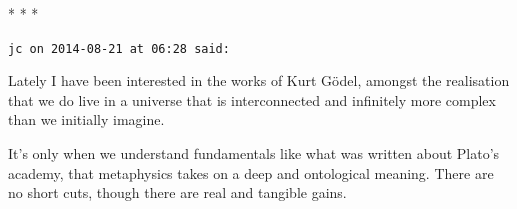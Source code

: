 
\begin{center}* * *\end{center}

\begin{footnotesize}\begin{sffamily}

\texttt{jc on 2014-08-21 at 06:28 said:} 

Lately I have been interested in the works of Kurt Gödel, amongst the realisation that we do live in a universe that is interconnected and infinitely more complex than we initially imagine.

It's only when we understand fundamentals like what was written about Plato's academy, that metaphysics takes on a deep and ontological meaning. There are no short cuts, though there are real and tangible gains.

\hfill

\end{sffamily}\end{footnotesize}
